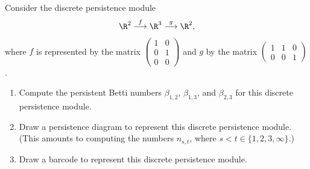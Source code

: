 \newcommand\Rips{\operatorname{Rips}}
\newcommand\Cech{\operatorname{Cech}}
\renewcommand\S{\mathbb{S}}

\begin{problem}[1]
  Consider the discrete persistence module
  \[%
    \R^2 \overset{f}{\longrightarrow} \R^3 \overset{g}{\longrightarrow} \R^2
  ,\]%
  where $f$ is represented by the matrix $\begin{pmatrix} 1 & 0 \\ 0 & 1\\ 0 & 0\end{pmatrix}$ and $g$ by the matrix $\begin{pmatrix} 1 & 1 & 0 \\ 0 & 0 & 1\end{pmatrix}$.
  \begin{enumerate}
    \item Compute the persistent Betti numbers $\beta_{1,2}$, $\beta_{1,3}$, and $\beta_{2,3}$ for this discrete persistence module.
    \item Draw a persistence diagram to represent this discrete persistence module.
      (This amounts to computing the numbers $n_{s,t}$, where $s < t \in \{1, 2, 3, \infty\}$.)
    \item Draw a barcode to represent this discrete persistence module.
  \end{enumerate}
\end{problem}

